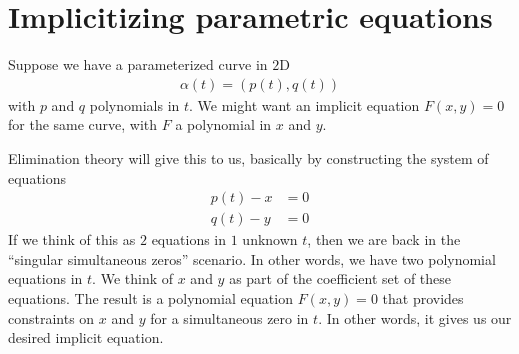 \section{Implicitizing parametric equations}


Suppose we have a parameterized curve in $2$D
\begin{align*}
  \alpha(t) = (p(t), q(t))
\end{align*}
with $p$ and $q$ polynomials in $t$. We might want an implicit
equation $F(x, y) = 0$ for the same curve, with $F$ a polynomial in
$x$ and $y$.

Elimination theory will give this to us, basically by constructing the
system of equations
\begin{align*}
  p(t) - x &= 0 \\
  q(t) - y &= 0
\end{align*}
If we think of this as $2$ equations in $1$ unknown $t$, then we are
back in the ``singular simultaneous zeros'' scenario. In other words,
we have two polynomial equations in $t$. We think of $x$ and $y$ as
part of the coefficient set of these equations. The result is a
polynomial equation $F(x, y) = 0$ that provides constraints on $x$ and
$y$ for a simultaneous zero in $t$. In other words, it gives us  our
desired implicit equation.

